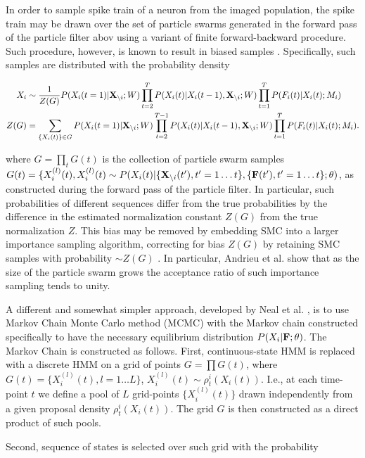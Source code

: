 In order to sample spike train of a neuron from the imaged population, the spike train may be drawn over the set of particle swarms generated in the forward pass of the particle filter abov using a variant of finite forward-backward procedure.  Such procedure, however, is known to result in biased samples \cite{Andrieu2007, NBR03}.
Specifically, such samples are distributed with the probability density

\begin{align}
X_i &\sim \frac{1}{Z(G)} P(X_i(t=1)|{\bf X}_{\backslash i}; W)\prod\limits_{t=2}^{T}P(X_i(t)|X_i(t-1), {\bf X}_{\backslash i}; W) \prod_{t=1}^{T} P(F_i(t)|X_i(t); M_i) \\
Z(G) &= \sum_{\{X_i(t)\}\in G} P(X_i(t=1)|{\bf X}_{\backslash i}; W) \prod_{t=2}^{T-1}P(X_i(t)|X_i(t-1), {\bf X}_{\backslash i}; W) \prod_{t=1}^{T}P(F_i(t)|X_i(t); M_i).
\end{align}

\noindent where $G=\prod\limits_t G(t)$ is the collection of particle swarm samples $G(t)=\{X_i^{(l)}(t), X_i^{(l)}(t) \sim P(X_i(t)|\{{\bf X}_{\backslash i}(t'),t'=1\ldots t\},\{{\bf F}(t'),t'=1\ldots t\};\theta)$, as constructed during the forward pass of the particle filter.  In particular, such probabilities of different sequences differ from the true probabilities by the difference in the estimated normalization constant $Z(G)$ from the true normalization $Z$.  This bias may be removed by embedding SMC into a larger importance sampling algorithm, correcting for bias $Z(G)$ by retaining SMC samples with probability $\sim Z(G)$ \cite{Andrieu2007}. In particular, Andrieu et al. \cite{Andrieu2007} show that as the size of the particle swarm grows the acceptance ratio of such importance sampling tends to unity.

A different and somewhat simpler approach, developed by Neal et al. \cite{NBR03}, is to use Markov Chain Monte Carlo method (MCMC) with the Markov chain constructed specifically to have the necessary equilibrium distribution $P(X_i| {\bf F}; \theta)$. The Markov Chain is constructed as follows. First, continuous-state HMM is replaced with a discrete HMM on a grid of points $G=\prod G(t)$, where $G(t) = \{X_i^{(l)}(t), l=1\ldots L\}$, $X_i^{(l)}(t)\sim \rho^i_t(X_i(t))$. I.e., at each time-point $t$ we define a pool of $L$ grid-points $\{X_i^{(l)}(t)\}$ drawn independently from a given proposal density $\rho^i_t(X_i(t))$. The grid $G$ is then constructed as a direct product of such pools.

Second, sequence of states is selected over such grid with the probability

